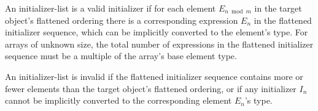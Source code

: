 \p An initializer-list is a valid initializer if for each element
\(E_{n \bmod m}\) in the target object's flattened ordering there is a
corresponding expression \(E_n\) in the flattened initializer sequence, which
can be implicitly converted to the element's type. For arrays of unknown size,
the total number of expressions in the flattened initializer sequence must be a
multiple of the array's base element type.

\p An initializer-list is invalid if the flattened initializer sequence contains
more or fewer elements than the target object's flattened ordering, or if any
initializer \(I_n\) cannot be implicitly converted to the corresponding element
\(E_n\)'s type.
